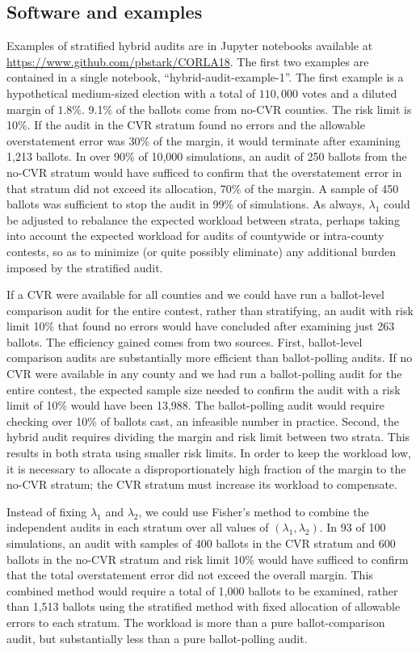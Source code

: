 \documentclass[12pt]{article}
\begin{document}
\subsection{Software and examples}
Examples of stratified hybrid audits are in Jupyter notebooks available
at \url{https://www.github.com/pbstark/CORLA18}.
The first two examples are contained in a single notebook, ``hybrid-audit-example-1''.
The first example is a hypothetical medium-sized election with a total of 
$110,000$ votes and a diluted margin of $1.8\%$.
9.1\% of the ballots come from no-CVR counties. The risk limit is 10\%.
If the audit in the CVR stratum found no errors and the allowable overstatement error was 30\% of the margin, 
it would terminate after examining 1,213 ballots.
In over 90\% of 10,000 simulations, an audit of 250 ballots from the no-CVR stratum
would have sufficed to confirm that the overstatement error in that stratum
did not exceed its allocation, 70\% of the margin.
A sample of 450 ballots was sufficient to stop the audit in 99\% of simulations.
As always, $\lambda_1$ could be adjusted to
rebalance the expected workload between strata, perhaps taking into account the expected
workload for audits of countywide or intra-county contests, so as to minimize (or quite possibly
eliminate) any additional burden imposed by the stratified audit.

If a CVR were available for all counties and we could have run a ballot-level comparison audit for the entire contest, 
rather than stratifying, an audit with risk limit 10\% that found no errors would have concluded after examining just 263 ballots.
The efficiency gained comes from two sources.
First, ballot-level comparison audits are substantially more efficient than ballot-polling audits.
If no CVR were available in any county and we had run a ballot-polling audit for the entire contest,
the expected sample size needed to confirm the audit with a risk limit of 10\% would have been 13,988.
The ballot-polling audit would require checking over 10\% of ballots cast, an infeasible number in practice.
Second, the hybrid audit requires dividing the margin and risk limit between two strata.
This results in both strata using smaller risk limits.
In order to keep the workload low, it is necessary to allocate a disproportionately high fraction of the margin
to the no-CVR stratum;
the CVR stratum must increase its workload to compensate.

Instead of fixing $\lambda_1$ and $\lambda_2$, we could use Fisher's method to combine the independent audits
in each stratum over all values of $(\lambda_1, \lambda_2)$.
In 93 of 100 simulations, an audit with samples of 400 ballots in the CVR stratum and 600 ballots in the no-CVR stratum
and risk limit 10\% would have sufficed to confirm that the total overstatement error did not exceed the overall margin.
This combined method would require a total of 1,000 ballots to be examined, rather than 1,513 ballots using the stratified 
method with fixed allocation of allowable errors to each stratum.
The workload is more than a pure ballot-comparison audit, but substantially less than a pure ballot-polling audit.
\end{document}
